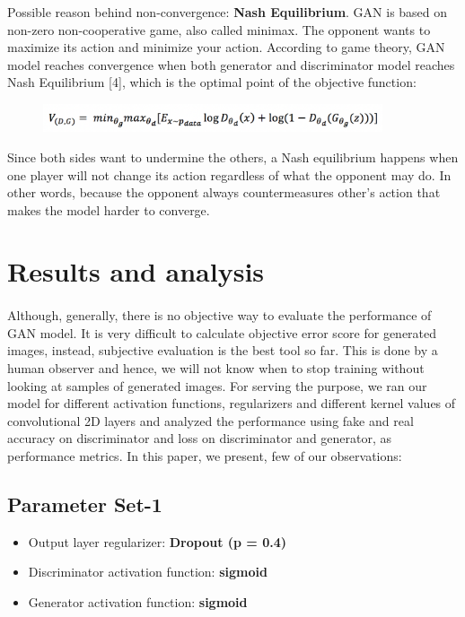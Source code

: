 \documentclass{article}
\begin{document}
Possible reason behind non-convergence: \textbf{Nash Equilibrium}.
GAN is based on non-zero non-cooperative game, also called minimax. The opponent wants to maximize its action and minimize your action. According to game theory, GAN model reaches convergence when both generator and discriminator model reaches Nash Equilibrium [4], which is the optimal point of the objective function: 

\begin{figure}[H]
	\centering
	\includegraphics[width=10cm]{figs/eq2}
\end{figure}

Since both sides want to undermine the others, a Nash equilibrium happens when one player will not change its action regardless of what the opponent may do. In other words, because the opponent always countermeasures other’s action that makes the model harder to converge.

\section{Results and analysis}
\label{headings}

\paragraph{}
Although, generally, there is no objective way to evaluate the performance of GAN model. It is very difficult to calculate objective error score for generated images, instead, subjective evaluation is the best tool so far. This is done by a human observer and hence, we will not know when to stop training without looking at samples of generated images. For serving the purpose, we ran our model for different activation functions, regularizers and different kernel values of convolutional 2D layers and analyzed the performance using fake and real accuracy on discriminator and loss on discriminator and generator, as performance metrics. In this paper, we present, few of our observations:

\subsection{Parameter Set-1}
\begin{itemize}
	\item Output layer regularizer: \textbf{Dropout (p = 0.4)}
	\item Discriminator activation function:  \textbf{sigmoid}
	\item Generator activation function:  \textbf{sigmoid}
\end{itemize}
\end{document}
